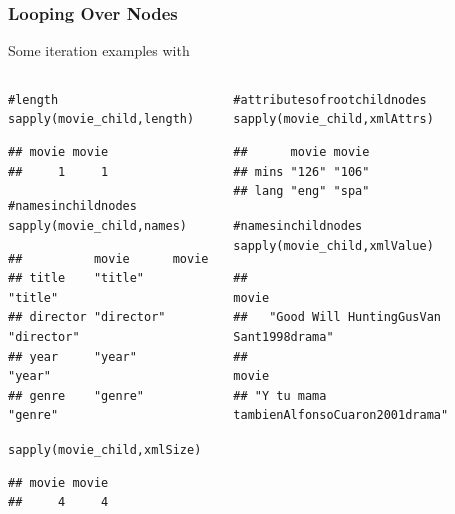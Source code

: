 \documentclass{beamer}\usepackage[]{graphicx}\usepackage[]{color}
\makeatletter
\newcommand{\hlcom}[1]{\textcolor[rgb]{0.588,0.588,0.588}{#1}}%
\newcommand{\hlstd}[1]{\textcolor[rgb]{0.196,0.196,0.196}{#1}}%
\newcommand{\hlkwd}[1]{\textcolor[rgb]{0.78,0.227,0.412}{#1}}%
\newenvironment{kframe}{%
 \def\at@end@of@kframe{}%
 \ifinner\ifhmode%
  \def\at@end@of@kframe{\end{minipage}}%
  \begin{minipage}{\columnwidth}%
 \fi\fi%
 \def\FrameCommand##1{\hskip\@totalleftmargin \hskip-\fboxsep
 \colorbox{shadecolor}{##1}\hskip-\fboxsep
     \hskip-\linewidth \hskip-\@totalleftmargin \hskip\columnwidth}%
 \MakeFramed {\advance\hsize-\width
   \@totalleftmargin\z@ \linewidth\hsize
   \@setminipage}}%
 {\par\unskip\endMakeFramed%
 \at@end@of@kframe}
\newenvironment{knitrout}{}{} %
\makeatother
\begin{document}
\begin{frame}[fragile]
\frametitle{Looping Over Nodes}

Some iteration examples with 

\begin{columns}[t]
\begin{column}{0.5\textwidth}
\begin{knitrout}\tiny
{}\color{fgcolor}\begin{kframe}
\begin{alltt}
\hlcom{# length}
\hlkwd{sapply}\hlstd{(movie_child, length)}
\end{alltt}
\begin{verbatim}
## movie movie 
##     1     1
\end{verbatim}
\begin{alltt}
\hlcom{# names in child nodes}
\hlkwd{sapply}\hlstd{(movie_child, names)}
\end{alltt}
\begin{verbatim}
##          movie      movie     
## title    "title"    "title"   
## director "director" "director"
## year     "year"     "year"    
## genre    "genre"    "genre"
\end{verbatim}
\begin{alltt}
\hlkwd{sapply}\hlstd{(movie_child, xmlSize)}
\end{alltt}
\begin{verbatim}
## movie movie 
##     4     4
\end{verbatim}
\end{kframe}
\end{knitrout}
\end{column}

\begin{column}{0.5\textwidth}
\begin{knitrout}\tiny
{}\color{fgcolor}\begin{kframe}
\begin{alltt}
\hlcom{# attributes of root child nodes}
\hlkwd{sapply}\hlstd{(movie_child, xmlAttrs)}
\end{alltt}
\begin{verbatim}
##      movie movie
## mins "126" "106"
## lang "eng" "spa"
\end{verbatim}
\begin{alltt}
\hlcom{# names in child nodes}
\hlkwd{sapply}\hlstd{(movie_child, xmlValue)}
\end{alltt}
\begin{verbatim}
##                                     movie 
##   "Good Will HuntingGusVan Sant1998drama" 
##                                     movie 
## "Y tu mama tambienAlfonsoCuaron2001drama"
\end{verbatim}
\end{kframe}
\end{knitrout}
\end{column}
\end{columns}

\end{frame}
\end{document}
